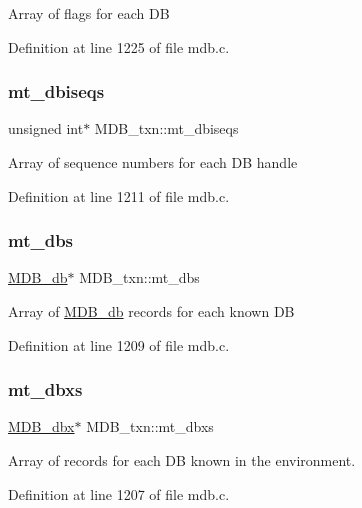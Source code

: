 Array of flags for each DB 

Definition at line 1225 of file mdb.\+c.

\mbox{\label{struct_m_d_b__txn_a17bc725a62160766a6f844b5602799ee}} 
\subsubsection{\texorpdfstring{mt\+\_\+dbiseqs}{mt\_dbiseqs}}
{\footnotesize\ttfamily unsigned int$\ast$ M\+D\+B\+\_\+txn\+::mt\+\_\+dbiseqs}

Array of sequence numbers for each DB handle 

Definition at line 1211 of file mdb.\+c.

\mbox{\label{struct_m_d_b__txn_a4e24dfe1a2ade2e1bf4c7305cef267b3}} 
\subsubsection{\texorpdfstring{mt\+\_\+dbs}{mt\_dbs}}
{\footnotesize\ttfamily \mbox{\hyperlink{struct_m_d_b__db}{M\+D\+B\+\_\+db}}$\ast$ M\+D\+B\+\_\+txn\+::mt\+\_\+dbs}

Array of \mbox{\hyperlink{struct_m_d_b__db}{M\+D\+B\+\_\+db}} records for each known DB 

Definition at line 1209 of file mdb.\+c.

\mbox{\label{struct_m_d_b__txn_aa837e463f7e79368b55bec22baa0233b}} 
\subsubsection{\texorpdfstring{mt\+\_\+dbxs}{mt\_dbxs}}
{\footnotesize\ttfamily \mbox{\hyperlink{struct_m_d_b__dbx}{M\+D\+B\+\_\+dbx}}$\ast$ M\+D\+B\+\_\+txn\+::mt\+\_\+dbxs}

Array of records for each DB known in the environment. 

Definition at line 1207 of file mdb.\+c.

